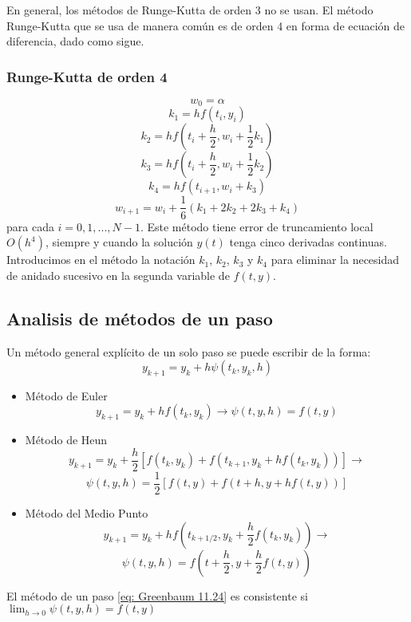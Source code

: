En general, los métodos de Runge-Kutta de orden 3 no se usan. El método Runge-Kutta que se usa de manera común es de orden 4 en forma de ecuación de diferencia, dado como sigue.

\subsubsection{Runge-Kutta de orden 4}

\[w_0 = \alpha\]
\[k_1 = hf(t_i, y_i)\]
\[k_2 = hf\left( t_i + \frac{h}{2}, w_i + \frac{1}{2} k_1 \right)\]
\[k_3 = hf \left( t_i + \frac{h}{2}, w_i + \frac{1}{2} k_2 \right)\]
\[k_4 = h f(t_{i + 1}, w_i + k_3)\]
\[w_{i + 1} = w_i + \frac{1}{6} (k_1 + 2 k_2 + 2 k_3 + k_4)\]
para cada $i = 0, 1, ..., N-1$. Este método tiene error de truncamiento local $O(h^4)$, siempre y cuando la solución $y(t)$ tenga cinco derivadas continuas. Introducimos en el método la notación $k_1$, $k_2$, $k_3$ y $k_4$ para eliminar la necesidad de anidado sucesivo en la segunda variable de $f(t, y)$.

\subsection{Analisis de métodos de un paso}

Un método general explícito de un solo paso se puede escribir de la forma:
\begin{equation}
    \label{eq: Greenbaum 11.24}
    y_{k + 1} = y_k + h \psi(t_k, y_k, h)
\end{equation}
\begin{itemize}
    \item Método de Euler
    \[ y_{k + 1} = y_k + h f(t_k, y_k) \rightarrow \psi(t, y, h) = f(t, y) \]
    \item Método de Heun
    \[ y_{k + 1} = y_k + \frac{h}{2} [f(t_k, y_k) + f(t_{k + 1}, y_k + h f(t_k, y_k))] \rightarrow \]
    \[ \psi(t, y, h) = \frac{1}{2} [f(t, y) + f(t + h, y + h f(t, y))] \]
    \item Método del Medio Punto
    \[ y_{k + 1} = y_k + h f(t_{k + 1/2}, y_k + \frac{h}{2} f(t_k, y_k)) \rightarrow \]
    \[ \psi(t, y, h) = f(t + \frac{h}{2}, y + \frac{h}{2} f(t, y)) \]
\end{itemize}

\begin{definition}
    El método de un paso \ref{eq: Greenbaum 11.24} es consistente si $\lim_{h \rightarrow 0} \psi (t, y, h) = f(t, y)$
\end{definition}

